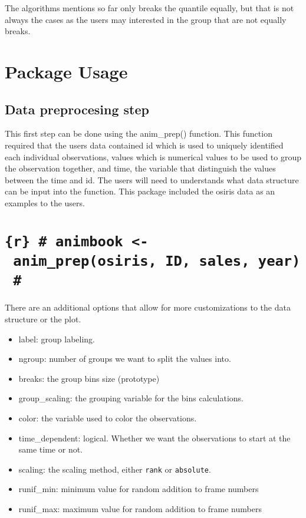 The algorithms mentions so far only breaks the quantile equally, but that is not always the cases as the users may interested in the group that are not equally breaks.

\hypertarget{package-usage}{%
\section{Package Usage}\label{package-usage}}

\hypertarget{data-preprocesing-step}{%
\subsection{Data preprocesing step}\label{data-preprocesing-step}}

This first step can be done using the anim\_prep() function. This function required that the users data contained id which is used to uniquely identified each individual observations, values which is numerical values to be used to group the observation together, and time, the variable that distinguish the values between the time and id. The users will need to understands what data structure can be input into the function. This package included the osiris data as an examples to the users.

\hypertarget{r-animbook---anim_preposiris-id-sales-year}{%
\section{\texorpdfstring{\texttt{\{r\}\ \#\ animbook\ \textless{}-\ anim\_prep(osiris,\ ID,\ sales,\ year)\ \#}}{\{r\} \# animbook \textless- anim\_prep(osiris, ID, sales, year) \#}}\label{r-animbook---anim_preposiris-id-sales-year}}

There are an additional options that allow for more customizations to the data structure or the plot.

\begin{itemize}
\tightlist
\item
  label: group labeling.
\item
  ngroup: number of groups we want to split the values into.
\item
  breaks: the group bins size (prototype)
\item
  group\_scaling: the grouping variable for the bins calculations.
\item
  color: the variable used to color the observations.
\item
  time\_dependent: logical. Whether we want the observations to start at the same time or not.
\item
  scaling: the scaling method, either \texttt{rank} or \texttt{absolute}.
\item
  runif\_min: minimum value for random addition to frame numbers
\item
  runif\_max: maximum value for random addition to frame numbers
\end{itemize}

